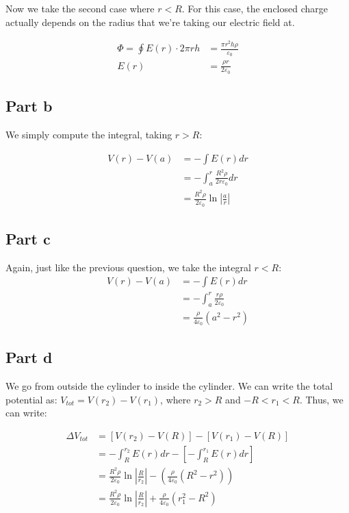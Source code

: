 \documentclass{article}
\theoremstyle{definition}
\numberwithin{equation}{section}
\numberwithin{definition}{section}
\begin{document}
    \medskip

    Now we take the second case where $r < R$. For this case, the enclosed charge actually depends on the radius that we're taking our electric field at.

    \begin{align*}
        \Phi = \oint E(r) \cdot 2\pi r h &= \frac{\pi r^2 h \rho}{\varepsilon_0}\\
        E(r) &= \frac{\rho r}{2\varepsilon_0}
    \end{align*}

    \subsection{Part b}

    We simply compute the integral, taking $r > R$:

    \begin{align*}
        V(r) - V(a) &= -\int E(r) dr \\
        &= -\int_a^r \frac{R^2\rho}{2r\varepsilon_0} dr\\
        &= \frac{R^2\rho}{2\varepsilon_0}\ln\left|\frac{a}{r}\right|
    \end{align*}

    \subsection{Part c}

    Again, just like the previous question, we take the integral $r < R$:
    \begin{align*}
        V(r) - V(a) &= -\int E(r) dr\\
        &= -\int_a^r \frac{r\rho}{2\varepsilon_0}\\
        &= \frac{\rho}{4\varepsilon_0} (a^2 - r^2)
    \end{align*}

    \subsection{Part d}

    We go from outside the cylinder to inside the cylinder. We can write the total potential as: $V_{tot} = V(r_2) - V(r_1)$, where $r_2 > R$ and $-R < r_1 < R$. Thus, we can write:

    \begin{align*}
        \Delta V_{tot} &= [V(r_2) - V(R)] - [V(r_1) - V(R)] \\
        &= -\int_R^{r_2} E(r) dr - \left[-\int_R^{r_1} E(r) dr\right]\\
        &= \frac{R^2\rho}{2\varepsilon_0}\ln\left|\frac{R}{r_2}\right| - \left(\frac{\rho}{4\varepsilon_0}(R^2 - r^2)\right)\\
        &= \frac{R^2\rho}{2\varepsilon_0} \ln \left|\frac{R}{r_2}\right| + \frac{\rho}{4\varepsilon_0} (r_1^2 - R^2)
    \end{align*}
\end{document}
